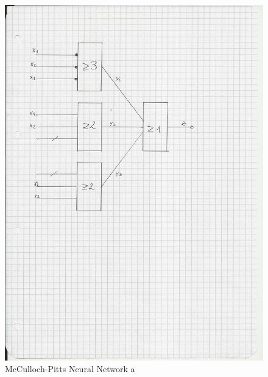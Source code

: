 \documentclass{scrartcl}
\begin{document}
\begin{figure}[ht]
\begin{center}
\includegraphics[scale=0.7]{Attachment1.jpg}
\end{center}
\caption{McCulloch-Pitts Neural Network a}
\label{Img:McCulloch-Pitts a}
\end{figure}
\end{document}
